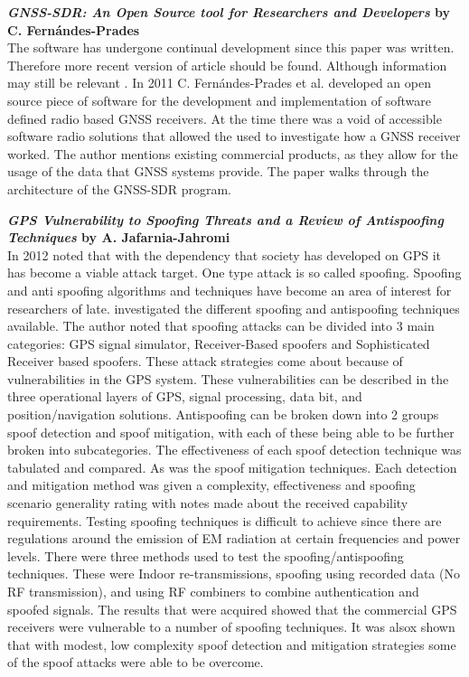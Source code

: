 \medskip

\textbf{\emph{GNSS-SDR: An Open Source tool for Researchers and Developers} by C. Fern\'andes-Prades} \\
The software has undergone continual development since this paper was written. Therefore more recent version of article should be found.
Although information may still be relevant \cite{RN16}.
In 2011 C. Fern\'andes-Prades et al. developed an open source piece of software for the development and implementation of software defined radio based
GNSS receivers. At the time there was a void of accessible software radio solutions that allowed the used to investigate how a GNSS receiver worked.
The author mentions existing commercial products, as they allow for the usage of the data that GNSS systems provide.
The paper walks through the architecture of the GNSS-SDR program.
\medskip

\textbf{\emph{GPS Vulnerability to Spoofing Threats and a Review of Antispoofing Techniques} by A. Jafarnia-Jahromi} \\
In 2012 \textcite{RN6} noted that with the dependency that society has developed on GPS it has become a viable attack target. One type attack is
so called spoofing. Spoofing and anti spoofing algorithms and techniques have become an area of interest for researchers of late. \citeauthor{RN6}
investigated the different spoofing and antispoofing techniques available. The author noted that spoofing attacks can be divided into 3 main categories:
GPS signal simulator, Receiver-Based spoofers and Sophisticated Receiver based spoofers. These attack strategies come about because of vulnerabilities in the GPS system.
These vulnerabilities can be described in the three operational layers of GPS, signal processing, data bit, and position/navigation solutions.
Antispoofing can be broken down into 2 groups spoof detection and spoof mitigation, with each of these being able to be further broken into subcategories.
The effectiveness of each spoof detection technique was tabulated and compared. As was the spoof mitigation techniques. Each detection and mitigation
method was given a complexity, effectiveness and spoofing scenario generality rating with notes made about the received capability requirements.
Testing spoofing techniques is difficult to achieve since there are regulations around the emission of EM radiation at certain frequencies and power levels.
There were three methods used to test the spoofing/antispoofing techniques. These were Indoor re-transmissions, spoofing using recorded data (No RF transmission), and
using RF combiners to combine authentication and spoofed signals.
The results that were acquired showed that the commercial GPS receivers were vulnerable to a number of spoofing techniques. It was alsox
shown that with modest, low complexity spoof detection and mitigation strategies some of the spoof attacks were able to be overcome.

